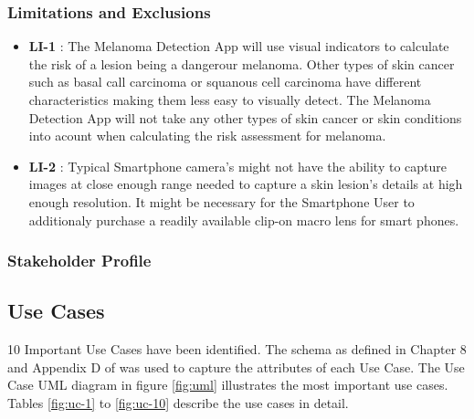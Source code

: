     \subsubsection{Limitations and Exclusions}

        \noindent
        \begin{itemize}[leftmargin=*]
            \item[]  \textbf{LI-1} : The Melanoma Detection App will use visual indicators to calculate the risk of a lesion being a dangerour melanoma. Other types of skin cancer such as basal call carcinoma or squanous cell carcinoma have different characteristics making them less easy to visually detect. The Melanoma Detection App will not take any other types of skin cancer or skin conditions into acount when calculating the risk assessment for melanoma.
            \item[]  \textbf{LI-2} : Typical Smartphone camera's might not have the ability to capture images at close enough range needed to capture a skin lesion's details at high enough resolution. It might be necessary for the Smartphone User to additionaly purchase a readily available clip-on macro lens for smart phones.

        \end{itemize}

    \subsubsection{Stakeholder Profile}


    \subsection{Use Cases}

        10 Important Use Cases have been identified. The schema as defined in Chapter 8 and Appendix D of \cite{wiegers2013software} was used to capture the attributes of each Use Case. The Use Case UML diagram in figure \ref{fig:uml} illustrates the most important use cases. Tables \ref{fig:uc-1} to \ref{fig:uc-10} describe the use cases in detail.

